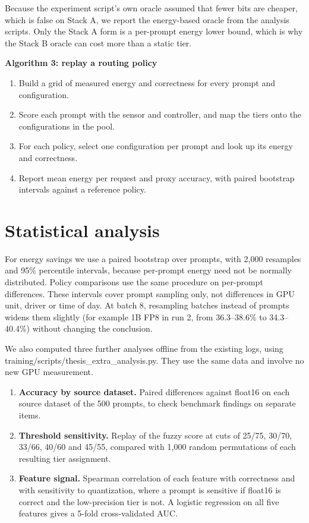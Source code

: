 Because the experiment script's own oracle assumed that fewer bits are cheaper, which is false on Stack A, we report the energy-based oracle from the analysis scripts. Only the Stack A form is a per-prompt energy lower bound, which is why the Stack B oracle can cost more than a static tier.

\textbf{Algorithm 3: replay a routing policy}

\begin{enumerate}
\item Build a grid of measured energy and correctness for every prompt and configuration.
\item Score each prompt with the sensor and controller, and map the tiers onto the configurations in the pool.
\item For each policy, select one configuration per prompt and look up its energy and correctness.
\item Report mean energy per request and proxy accuracy, with paired bootstrap intervals against a reference policy.
\end{enumerate}
\section{Statistical analysis}
For energy savings we use a paired bootstrap over prompts, with 2,000 resamples and 95\% percentile intervals, because per-prompt energy need not be normally distributed. Policy comparisons use the same procedure on per-prompt differences. These intervals cover prompt sampling only, not differences in GPU unit, driver or time of day. At batch 8, resampling batches instead of prompts widens them slightly (for example 1B FP8 in run 2, from 36.3--38.6\% to 34.3--40.4\%) without changing the conclusion.

We also computed three further analyses offline from the existing logs, using training/scripts/thesis\_\allowbreak{}extra\_\allowbreak{}analysis.py. They use the same data and involve no new GPU measurement.

\begin{enumerate}
\item \textbf{Accuracy by source dataset.} Paired differences against float16 on each source dataset of the 500 prompts, to check benchmark findings on separate items.
\item \textbf{Threshold sensitivity.} Replay of the fuzzy score at cuts of 25/75, 30/70, 33/66, 40/60 and 45/55, compared with 1,000 random permutations of each resulting tier assignment.
\item \textbf{Feature signal.} Spearman correlation of each feature with correctness and with sensitivity to quantization, where a prompt is sensitive if float16 is correct and the low-precision tier is not. A logistic regression on all five features gives a 5-fold cross-validated AUC.
\end{enumerate}

